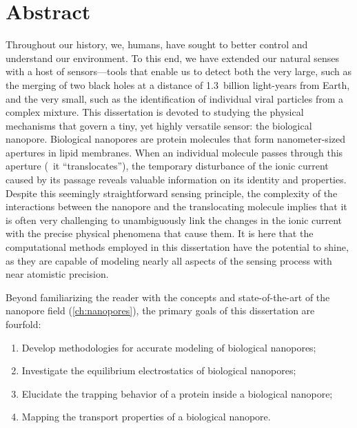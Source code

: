 \chapter{Abstract}
%
\label{ch:abstract}
%

Throughout our history, we, humans, have sought to better control and understand our environment. To this end,
we have extended our natural senses with a host of sensors---tools that enable us to detect both the very
large, such as the merging of two black holes at a distance of \num{1.3}~billion light-years from Earth, and
the very small, such as the identification of individual viral particles from a complex mixture. This
dissertation is devoted to studying the physical mechanisms that govern a tiny, yet highly versatile sensor:
the biological nanopore. Biological nanopores are protein molecules that form nanometer-sized apertures in
lipid membranes. When an individual molecule passes through this aperture (\ie~it ``translocates''), the
temporary disturbance of the ionic current caused by its passage reveals valuable information on its identity
and properties. Despite this seemingly straightforward sensing principle, the complexity of the interactions
between the nanopore and the translocating molecule implies that it is often very challenging to unambiguously
link the changes in the ionic current with the precise physical phenomena that cause them. It is here that
the computational methods employed in this dissertation have the potential to shine, as they are capable of
modeling nearly all aspects of the sensing process with near atomistic precision.

Beyond familiarizing the reader with the concepts and state-of-the-art of the nanopore field
(\cref{ch:nanopores}), the primary goals of this dissertation are fourfold:
%
\begin{enumerate}
  \item Develop methodologies for accurate modeling of biological nanopores;
  \item Investigate the equilibrium electrostatics of biological nanopores;
  \item Elucidate the trapping behavior of a protein inside a biological nanopore;
  \item Mapping the transport properties of a biological nanopore.
\end{enumerate}
%

